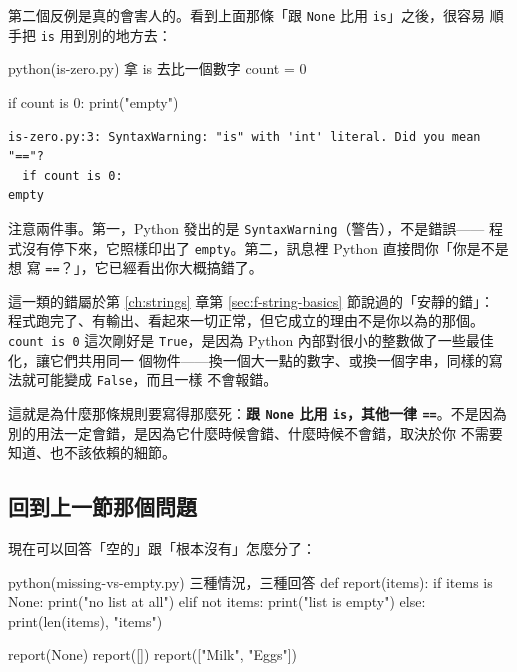 
第二個反例是真的會害人的。看到上面那條「跟 \texttt{None} 比用 \texttt{is}」之後，很容易
順手把 \texttt{is} 用到別的地方去：

\begin{example}{python}{(is-zero.py) 拿 is 去比一個數字}
count = 0

if count is 0:
    print("empty")
\end{example}

\begin{verbatim}
is-zero.py:3: SyntaxWarning: "is" with 'int' literal. Did you mean "=="?
  if count is 0:
empty
\end{verbatim}

注意兩件事。第一，Python 發出的是 \texttt{SyntaxWarning}（警告），不是錯誤——
程式沒有停下來，它照樣印出了 \texttt{empty}。第二，訊息裡 Python 直接問你「你是不是想
寫 \texttt{==}？」，它已經看出你大概搞錯了。

這一類的錯屬於第 \ref{ch:strings} 章第 \ref{sec:f-string-basics} 節說過的「安靜的錯」：
程式跑完了、有輸出、看起來一切正常，但它成立的理由不是你以為的那個。\texttt{count is 0}
這次剛好是 \texttt{True}，是因為 Python 內部對很小的整數做了一些最佳化，讓它們共用同一
個物件——換一個大一點的數字、或換一個字串，同樣的寫法就可能變成 \texttt{False}，而且一樣
不會報錯。

這就是為什麼那條規則要寫得那麼死：\textbf{跟 \texttt{None} 比用 \texttt{is}，其他一律
\texttt{==}}。不是因為別的用法一定會錯，是因為它什麼時候會錯、什麼時候不會錯，取決於你
不需要知道、也不該依賴的細節。

\subsection*{回到上一節那個問題}

現在可以回答「空的」跟「根本沒有」怎麼分了：

\begin{example}{python}{(missing-vs-empty.py) 三種情況，三種回答}
def report(items):
    if items is None:
        print("no list at all")
    elif not items:
        print("list is empty")
    else:
        print(len(items), "items")


report(None)
report([])
report(["Milk", "Eggs"])
\end{example}


